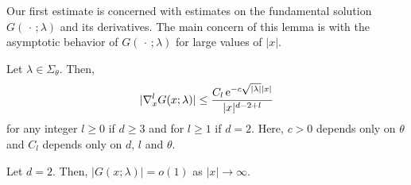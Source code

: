 Our first estimate is concerned with estimates on the fundamental solution $G(\,\cdot\,;\lambda)$ and its derivatives.
The main concern of this lemma is with the asymptotic behavior of $G(\,\cdot\,; \lambda)$ for large values of $|x|$.

\begin{lem}
  \label{lem:estimateHelmholtzDerivatives}
  Let $\lambda \in \Sigma_\theta$.
  Then,
  \begin{align}
    \label{eq:estimateHelmholtzDerivatives}
    |\nabla_x^l G(x; \lambda)| \leq \frac{ C_l \, \mathrm{e}^{-c \sqrt{|\lambda|} |x|}}{|x|^{d - 2 + l}}
  \end{align}
  for any integer $l \geq 0$ if $d \geq 3$ and for $l \geq 1$ if $d = 2$.
  Here, $c > 0$ depends only on $\theta$ and $C_l$ depends only on $d$, $l$ and $\theta$.

  Let $d = 2$. Then, $|G(x; \lambda)| = o(1)$ as $|x| \to \infty$.
\end{lem}

